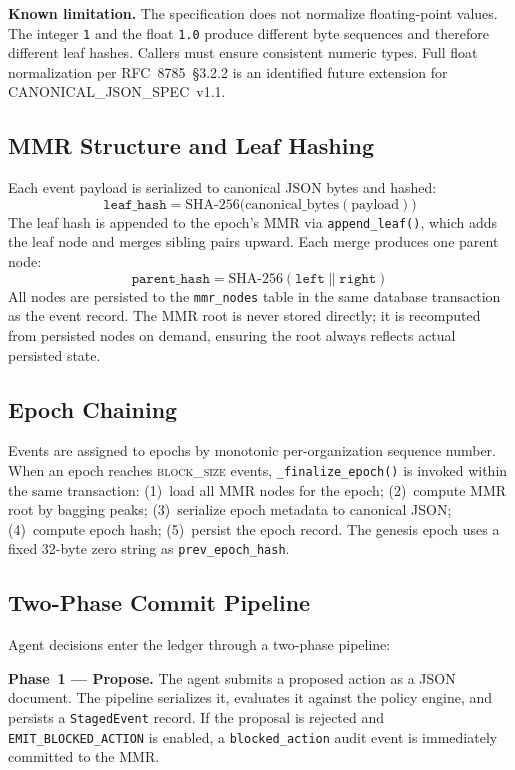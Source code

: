 \documentclass{article}
\begin{document}
\textbf{Known limitation.} The specification does not normalize floating-point
values. The integer \texttt{1} and the float \texttt{1.0} produce different byte
sequences and therefore different leaf hashes. Callers must ensure consistent
numeric types. Full float normalization per RFC~8785~\S3.2.2 is an identified
future extension for CANONICAL\_JSON\_SPEC~v1.1.

\subsection{MMR Structure and Leaf Hashing}

Each event payload is serialized to canonical JSON bytes and hashed:
\[
\texttt{leaf\_hash} = \text{SHA-256}\bigl(\text{canonical\_bytes}(\text{payload})\bigr)
\]
The leaf hash is appended to the epoch's MMR via \texttt{append\_leaf()}, which
adds the leaf node and merges sibling pairs upward. Each merge produces one
parent node:
\[
\texttt{parent\_hash} = \text{SHA-256}(\texttt{left} \| \texttt{right})
\]
All nodes are persisted to the \texttt{mmr\_nodes} table in the same database
transaction as the event record. The MMR root is never stored directly; it is
recomputed from persisted nodes on demand, ensuring the root always reflects
actual persisted state.

\subsection{Epoch Chaining}

Events are assigned to epochs by monotonic per-organization sequence number.
When an epoch reaches \textsc{block\_size} events, \texttt{\_finalize\_epoch()}
is invoked within the same transaction: (1)~load all MMR nodes for the epoch;
(2)~compute MMR root by bagging peaks; (3)~serialize epoch metadata to canonical
JSON; (4)~compute epoch hash; (5)~persist the epoch record. The genesis epoch
uses a fixed 32-byte zero string as \texttt{prev\_epoch\_hash}.

\subsection{Two-Phase Commit Pipeline}

Agent decisions enter the ledger through a two-phase pipeline:

\textbf{Phase~1 --- Propose.} The agent submits a proposed action as a JSON
document. The pipeline serializes it, evaluates it against the policy engine,
and persists a \texttt{StagedEvent} record. If the proposal is rejected and
\texttt{EMIT\_BLOCKED\_ACTION} is enabled, a \texttt{blocked\_action} audit
event is immediately committed to the MMR.
\end{document}
